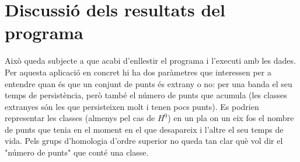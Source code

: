 \documentclass[12pt]{article}
\begin{document}
\section{Discussió dels resultats del programa}
Això queda subjecte a que acabi d'enllestir el programa i l'executi amb les dades. Per
aquesta aplicació en concret hi ha dos paràmetres que interessen per a entendre quan és
que un conjunt de punts és extrany o no: per una banda el seu temps de persistència, però
també el número de punts que acumula (les classes extranyes són les que persisteixen
molt i tenen pocs punts). Es podrien representar les classes (almenys pel cas de \( H^0
\)) en un pla on un eix fos el nombre de punts que tenia en el moment en el que desapareix
i l'altre el seu temps de vida. Pels grups d'homologia d'ordre superior no queda tan clar
què vol dir el "número de punts" que conté una classe. 
\end{document}
